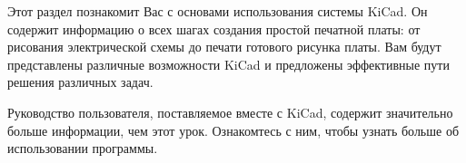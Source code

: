 



Этот раздел познакомит Вас с основами использования системы KiCad. Он содержит
информацию о всех шагах создания простой печатной платы: от рисования
электрической схемы до печати готового рисунка платы. Вам будут представлены
различные возможности KiCad и предложены эффективные пути решения различных
задач.

Руководство пользователя, поставляемое вместе с KiCad, содержит значительно
больше информации, чем этот урок. Ознакомтесь с ним, чтобы узнать больше об
использовании программы.



\secdown










\secup